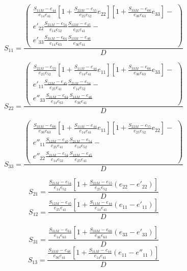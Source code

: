 \begin{equation}
S_{11}=
	\frac{
	\left(\begin{split}
	\frac{S_{11M}-e_{44}}{e_{14}e_{41}}
	\left[ 1+\frac{S_{22M}-e_{55}}{e_{25}e_{52}}e_{22}\right]
	\left[ 1+\frac{S_{33M}-e_{66}}{e_{36}e_{63}}e_{33}\right]-\\
	e'_{22}\frac{S_{21M}-e_{54}}{e_{14}e_{52}}\frac{S_{12M}-e_{45}}{e_{25}e_{41}}-\\
	e'_{33}\frac{S_{31M}-e_{64}}{e_{14}e_{63}}\frac{S_{13M}-e_{46}}{e_{36}e_{41}}	
	\end{split}\right)
	} {D}
\end{equation}

\begin{equation}
S_{22}=
\frac{
	\left(\begin{split}
	\frac{S_{22M}-e_{55}}{e_{25}e_{52}}
	\left[ 1+\frac{S_{11M}-e_{44}}{e_{14}e_{41}}e_{11}\right]
	\left[ 1+\frac{S_{33M}-e_{66}}{e_{36}e_{63}}e_{33}\right]-\\
	e'_{11}\frac{S_{12M}-e_{45}}{e_{25}e_{41}}\frac{S_{21M}-e_{54}}{e_{14}e_{52}}-\\
	e''_{33}\frac{S_{31M}-e_{64}}{e_{14}e_{63}}\frac{S_{13M}-e_{46}}{e_{36}e_{41}}	
	\end{split}\right)
} {D}
\end{equation}

\begin{equation}
S_{33}=
\frac{
	\left(\begin{split}
	\frac{S_{33M}-e_{66}}{e_{36}e_{63}}
	\left[ 1+\frac{S_{11M}-e_{44}}{e_{14}e_{41}}e_{11}\right]
	\left[ 1+\frac{S_{22M}-e_{55}}{e_{25}e_{52}}e_{22}\right]-\\
	e''_{11}\frac{S_{12M}-e_{45}}{e_{25}e_{41}}\frac{S_{21M}-e_{54}}{e_{14}e_{52}}-\\	
	e''_{22}\frac{S_{21M}-e_{54}}{e_{14}e_{52}}\frac{S_{12M}-e_{45}}{e_{25}e_{41}}
	\end{split}\right)
} {D}
\end{equation}

\begin{equation}
S_{21} = \frac{\frac{S_{21M}-e_{54}}{e_{14}e_{52}}\left[1+\frac{S_{22M}-e_{55}}{e_{25}e_{52}}(e_{22}-e'_{22})\right]}{D}
\end{equation}
\begin{equation}
S_{12} = \frac{\frac{S_{12M}-e_{45}}{e_{25}e_{41}}\left[1+\frac{S_{11M}-e_{44}}{e_{14}e_{41}}(e_{11}-e'_{11})\right]}{D}
\end{equation}

\begin{equation}
S_{31} = \frac{\frac{S_{31M}-e_{64}}{e_{14}e_{63}}\left[1+\frac{S_{33M}-e_{66}}{e_{36}e_{63}}(e_{33}-e'_{33})\right]}{D}
\end{equation}
\begin{equation}
S_{13} = \frac{\frac{S_{13M}-e_{46}}{e_{36}e_{41}}\left[1+\frac{S_{11M}-e_{44}}{e_{14}e_{41}}(e_{11}-e''_{11})\right]}{D}
\end{equation}

